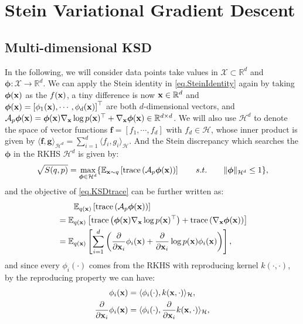 \documentclass{article}
\begin{document}
\section{Stein Variational Gradient Descent}
\subsection{Multi-dimensional KSD}
In the following, we will consider data points take values in $\mathcal{X} \subset \mathbb{R}^d$ and $\bm \phi: \mathcal{X} \to \mathbb{R}^d$. We can apply the Stein identity in \eqref{eq.SteinIdentity} again by taking $\bm\phi({\mathbf{x}})$ as the $f({\mathbf{x}})$, a tiny difference is now ${\mathbf{x}} \in \mathbb{R}^d$ and $\bm\phi({\mathbf{x}}) = \left[ \phi_1({\mathbf{x}}), \cdots, \phi_d({\mathbf{x}}) \right]^\top$ are both $d$-dimensional vectors, and $\mathcal{A}_p \bm\phi({\mathbf{x}}) = \bm\phi({\mathbf{x}})\nabla_{\mathbf{x}}\log p({\mathbf{x}})^\top + \nabla_{\mathbf{x}} \bm\phi({\mathbf{x}}) \in \mathbb{R}^{d\times d}$. We will also use $\mathcal{H}^d$ to denote the space of vector functions $\bm f = \left[ f_1, \cdots, f_d \right]$ with $f_d \in \mathcal{H}$, whose inner product is given by $\langle \bm f , \bm g \rangle_{\mathcal{H}^d} = \sum_{i=1}^d \langle f_i, g_i \rangle_{\mathcal{H}}$. And the Stein discrepancy which searches the $\bm \phi$ in the RKHS $\mathcal{H}^d$  is given by:
\begin{equation}\label{eq.KSDtrace}
    \sqrt{S(q, p)} = \max_{\bm \phi \in \mathcal{H}^d} \{ \mathbb{E}_{{\mathbf{x}} \sim q}\left[ \mathrm{trace}\left( \mathcal{A}_p \bm \phi({\mathbf{x}}) \right) \right] \qquad s.t. \qquad \|\bm \phi\|_{\mathcal{H}^d} \leq 1 \},
\end{equation}
and the objective of \eqref{eq.KSDtrace} can be further written as:
\begin{align}
    &\qquad \mathbb{E}_{q({\mathbf{x}})} \left[ \mathrm{trace}\left( \mathcal{A}_p \bm \phi({\mathbf{x}}) \right) \right] \\
    &= \mathbb{E}_{q({\mathbf{x}})} \left[ \mathrm{trace}\left( \bm\phi({\mathbf{x}}) \nabla_{\mathbf{x}} \log p({\mathbf{x}})^\top \right) + \mathrm{trace}\left( \nabla_{\mathbf{x}} \bm \phi({\mathbf{x}}) \right) \right] \\
    &= \mathbb{E}_{q({\mathbf{x}})} \left[ \sum_{i=1}^d\left( \frac{\partial}{\partial {\mathbf{x}}_i}\phi_i({\mathbf{x}}) + \frac{\partial}{\partial {\mathbf{x}}_i}\log p({\mathbf{x}})\phi_i({\mathbf{x}}) \right) \right] \label{eq.traceKSD},
\end{align}
and since every $\phi_i(\cdot)$ comes from the RKHS with reproducing kernel $k(\cdot, \cdot)$, by the reproducing property we can have:
\begin{align}
    \phi_i({\mathbf{x}}) &= \langle \phi_i(\cdot), k({\mathbf{x}}, \cdot) \rangle_\mathcal{H}, \\
    \frac{\partial}{\partial {\mathbf{x}}_i}\phi_i({\mathbf{x}}) &= \langle \phi_i(\cdot), \frac{\partial}{\partial {\mathbf{x}}_i}k({\mathbf{x}}, \cdot) \rangle_{\mathcal{H}},
\end{align}
\end{document}
